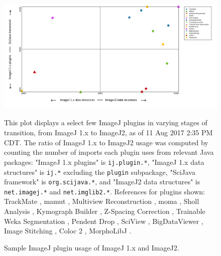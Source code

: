 \documentclass{bmcart}
\begin{document}
\begin{backmatter}
  \begin{figure}[h!]
    \caption{Sample ImageJ plugin usage of ImageJ 1.x and ImageJ2.}
    \includegraphics[width=4.75in,natwidth=1743,natheight=859]{figure-s.3/ij-imagej-plugins-figure.png}
    \begin{flushleft}
      This plot displays a select few ImageJ plugins in varying stages of
      transition, from ImageJ 1.x to ImageJ2, as of 11 Aug 2017 2:35 PM CDT.
      The ratio of ImageJ 1.x to ImageJ2 usage was computed by counting the
      number of imports each plugin uses from relevant Java packages:
      "ImageJ 1.x plugins" is \texttt{ij.plugin.*}, "ImageJ 1.x data
      structures" is \texttt{ij.*} excluding the \texttt{plugin} subpackage,
      "SciJava framework" is \texttt{org.scijava.*}, and "ImageJ2 data
      structures" is \texttt{net.imagej.*} and \texttt{net.imglib2.*}.
      References for plugins shown:
      TrackMate                    \cite{trackmate},
      \acrshort{mamut}             \cite{imagej_mamut},
      Multiview Reconstruction     \cite{multiview_2010, multiview_2014},
      \acrfull{moma}               \cite{moma_seg, moma_tracking},
      Sholl Analysis               \cite{sholl_analysis},
      Kymograph Builder            \cite{kymograph},
      Z-Spacing Correction         \cite{z_spacing},
      Trainable Weka Segmentation  \cite{trainable_weka},
      Pendent Drop                 \cite{pendent_drop},
      SciView                      \cite{sciview},
      BigDataViewer                \cite{bigdataviewer},
      Image Stitching              \cite{image_stitching},
      Coloc 2                      \cite{imagej_coloc_2},
      MorphoLibJ                   \cite{morpholibj}.
    \end{flushleft}
  \end{figure}

\FloatBarrier


\end{backmatter}
\end{document}
